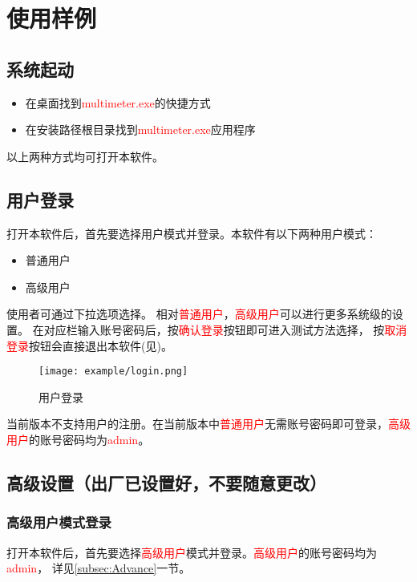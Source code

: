 \chapter{使用样例}
\section{系统起动}
\begin{itemize}
	\item 在桌面找到\textcolor{red}{multimeter.exe}的快捷方式
	\item 在安装路径根目录找到\textcolor{red}{multimeter.exe}应用程序
\end{itemize}
以上两种方式均可打开本软件。
\section{用户登录\label{subsec:Advance}}
打开本软件后，首先要选择用户模式并登录。本软件有以下两种用户模式：
\begin{itemize}
	\item 普通用户
	\item 高级用户
\end{itemize}
使用者可通过下拉选项选择。
相对\textcolor{red}{普通用户}，\textcolor{red}{高级用户}可以进行更多系统级的设置。
在对应栏输入账号密码后，按\textcolor{red}{确认登录}按钮即可进入测试方法选择，
按\textcolor{red}{取消登录}按钮会直接退出本软件(见)。
\begin{figure}[htbp]
	\centering
	\texttt{[image: example/login.png]}
	\caption{ 用户登录 \label{fig:exmp_login}}
\end{figure}
\begin{note}
	当前版本不支持用户的注册。在当前版本中\textcolor{red}{普通用户}无需账号密码即可登录，\textcolor{red}{高级用户}的账号密码均为\textcolor{red}{admin}。
\end{note}






\section{高级设置（出厂已设置好，不要随意更改）}
\subsection{高级用户模式登录}
打开本软件后，首先要选择\textcolor{red}{高级用户}模式并登录。\textcolor{red}{高级用户}的账号密码均为\textcolor{red}{admin}，
详见\ref{subsec:Advance}一节。

